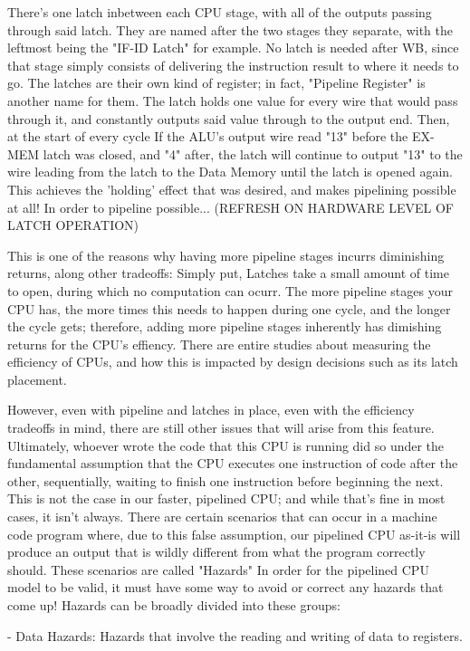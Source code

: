 \documentclass[12pt,twoside]{reedthesis}
\begin{document}
There's one latch inbetween each CPU stage, with all of the outputs passing through said latch. They are named after the two stages they separate, with the leftmost being the "IF-ID Latch" for example. No latch is needed after WB, since that stage simply consists of delivering the instruction result to where it needs to go.
The latches are their own kind of register; in fact, "Pipeline Register" is another name for them. The latch holds one value for every wire that would pass through it, and constantly outputs said value through to the output end. Then, at the start of every cycle If the ALU's output wire read "13" before the EX-MEM latch was closed, and "4" after, the latch will continue to output "13" to the wire leading from the latch to the Data Memory until the latch is opened again. This achieves the 'holding' effect that was desired, and makes pipelining possible at all! In order to pipeline possible... (REFRESH ON HARDWARE LEVEL OF LATCH OPERATION)

This is one of the reasons why having more pipeline stages incurrs diminishing returns, along other tradeoffs: Simply put, Latches take a small amount of time to open, during which no computation can ocurr. The more pipeline stages your CPU has, the more times this needs to happen during one cycle, and the longer the cycle gets; therefore, adding more pipeline stages inherently has dimishing returns for the CPU's effiency. There are entire studies about measuring the efficiency of CPUs, and how this is impacted by design decisions such as its latch placement.

However, even with pipeline and latches in place, even with the efficiency tradeoffs in mind, there are still other issues that will arise from this feature. Ultimately, whoever wrote the code that this CPU is running did so under the fundamental assumption that the CPU executes one instruction of code after the other, sequentially, waiting to finish one instruction before beginning the next. This is not the case in our faster, pipelined CPU; and while that's fine in most cases, it isn't always. There are certain scenarios that can occur in a machine code program where, due to this false assumption, our pipelined CPU as-it-is will produce an output that is wildly different from what the program correctly should. These scenarios are called "Hazards" In order for the pipelined CPU model to be valid, it must  have some way to avoid or correct any hazards that come up! Hazards can be broadly divided into these groups:

- Data Hazards: Hazards that involve the reading and writing of data to registers.
\end{document}
